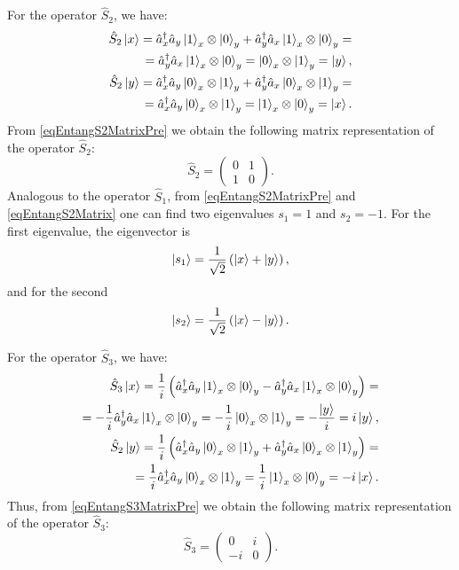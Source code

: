 For the operator $\hat{S}_2$, we have:
\begin{eqnarray}
\hat{S}_2 \ket{x} = \hat{a}_x^{\dag} \hat{a}_y
\ket{1}_x\otimes\ket{0}_y + \hat{a}_y^{\dag}
\hat{a}_x\ket{1}_x\otimes\ket{0}_y =
\nonumber \\
= 
\hat{a}_y^{\dag}
\hat{a}_x\ket{1}_x\otimes\ket{0}_y =
\ket{0}_x\otimes\ket{1}_y = \ket{y},
\nonumber \\
\hat{S}_2 \ket{y} = \hat{a}_x^{\dag} \hat{a}_y
\ket{0}_x\otimes\ket{1}_y + \hat{a}_y^{\dag}
\hat{a}_x\ket{0}_x\otimes\ket{1}_y =
\nonumber \\
=
\hat{a}_x^{\dag} \hat{a}_y
\ket{0}_x\otimes\ket{1}_y
=\ket{1}_x\otimes\ket{0}_y = \ket{x}.
\label{eqEntangS2MatrixPre}
\end{eqnarray}
From \eqref{eqEntangS2MatrixPre} we obtain the following matrix representation
of the operator $\hat{S}_2$:
\begin{equation}
\hat{S}_2 = 
\left(
\begin{array}{cc}
0 & 1 \\
1 & 0 
\end{array}
\right).
\label{eqEntangS2Matrix}
\end{equation}
Analogous to the operator $\hat{S}_1$, from \eqref{eqEntangS2MatrixPre} and
\eqref{eqEntangS2Matrix} one can find two eigenvalues $s_1 =
1$ and $s_2 = -1$.
For the first eigenvalue, the eigenvector is
\begin{equation}
\ket{s_1} = \frac{1}{\sqrt{2}}\left(\ket{x} +
\ket{y}\right),
\label{eq:part2:pol:stocks_s2_1}
\end{equation}
and for the second
\begin{equation}
\ket{s_2} = \frac{1}{\sqrt{2}}\left(\ket{x} - \ket{y}\right).
\label{eq:part2:pol:stocks_s2_2}
\end{equation}

For the operator $\hat{S}_3$, we have:
\begin{eqnarray}
  \hat{S}_3 \ket{x} = \frac{1}{i}\left(\hat{a}_x^{\dag} \hat{a}_y
\ket{1}_x\otimes\ket{0}_y - \hat{a}_y^{\dag}
\hat{a}_x\ket{1}_x\otimes\ket{0}_y\right) =
\nonumber \\
= 
-\frac{1}{i}\hat{a}_y^{\dag}
\hat{a}_x\ket{1}_x\otimes\ket{0}_y =
-\frac{1}{i}\ket{0}_x\otimes\ket{1}_y =
-\frac{\ket{y}}{i} = i \ket{y},
\nonumber \\
\hat{S}_2 \ket{y} = \frac{1}{i}\left(\hat{a}_x^{\dag} \hat{a}_y
\ket{0}_x\otimes\ket{1}_y + \hat{a}_y^{\dag}
\hat{a}_x\ket{0}_x\otimes\ket{1}_y\right) =
\nonumber \\
=
\frac{1}{i}\hat{a}_x^{\dag} \hat{a}_y
\ket{0}_x\otimes\ket{1}_y
=\frac{1}{i}\ket{1}_x\otimes\ket{0}_y =
-i \ket{x}.
\label{eqEntangS3MatrixPre}
\end{eqnarray}
Thus, from \eqref{eqEntangS3MatrixPre} we obtain the following
matrix representation of the operator $\hat{S}_3$:
\begin{equation}
\hat{S}_3 = 
\left(
\begin{array}{cc}
0 & i \\
-i & 0 
\end{array}
\right).
\label{eqEntangS3Matrix}
\end{equation}

